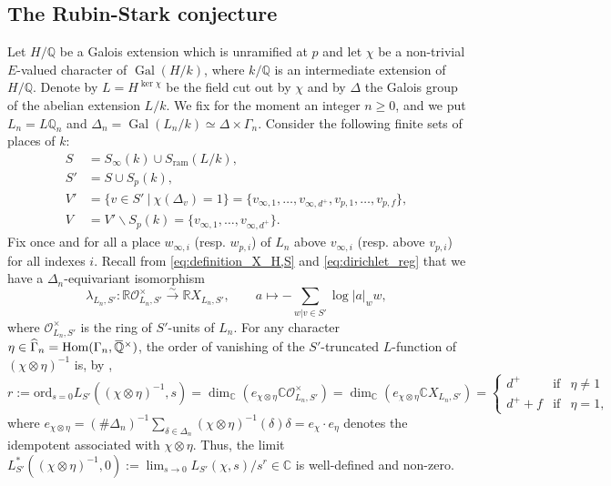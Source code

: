 \documentclass[12pt]{amsart}
\newcommand\bR{\mathbb{R}}
\newcommand\bC{\mathbb{C}}
\newcommand\bQ{\mathbb{Q}}
\newcommand\cO{\mathcal{O}}
\newcommand{\ob}[1]{\mkern 1.5mu\overline{\mkern-1.5mu#1\mkern-1.5mu}\mkern 1.5mu}
\newcommand{\ord}{\mathrm{ord}}
\DeclareMathOperator{\Gal}{Gal}
\DeclareMathOperator{\Hom}{Hom}
\newcommand{\ram}{\textrm{ram}}
\theoremstyle{defstyle}
\theoremstyle{thmstyle}
\begin{document}
\subsection{The Rubin-Stark conjecture}\label{sec:RS_conjecture}
Let $H/\bQ$ be a Galois extension which is unramified at $p$ and let $\chi$ be a non-trivial $E$-valued character of $\Gal(H/k)$, where $k/\bQ$ is an intermediate extension of $H/\bQ$. Denote by $L=H^{\ker\chi}$ be the field cut out by $\chi$ and by $\Delta$ the Galois group of the abelian extension $L/k$. We fix for the moment an integer $n\geq 0$, and we put $L_n=L\bQ_n$ and $\Delta_n=\Gal(L_n/k)\simeq \Delta \times \Gamma_n$. Consider the following finite sets of places of $k$:
\begin{align*}
S&=S_\infty(k)\cup S_\ram(L/k),\\
S'&=S \cup S_p(k),\\
 V'&= \{v \in S'\ \big|\  \chi(\Delta_v)=1\}=\{v_{\infty,1},\ldots,v_{\infty,d^+},v_{p,1},\ldots,v_{p,f}\}, \\
 V&= V' \backslash S_p(k)=\{v_{\infty,1},\ldots,v_{\infty,d^+}\}.
\end{align*}
Fix once and for all a place $w_{\infty,i}$ (resp. $w_{p,i}$) of $L_n$ above $v_{\infty,i}$ (resp. above $v_{p,i}$) for all indexes $i$. Recall from \eqref{eq:definition_X_H,S} and \eqref{eq:dirichlet_reg} that we have a $\Delta_n$-equivariant isomorphism
\begin{equation*}
\lambda_{{L_n},S'} : \bR\cO_{{L_n},S'}^\times \overset{\sim}{\longrightarrow}\bR X_{{L_n},S'}, \qquad a\mapsto - \sum_{w|v\in S'}\log|a|_ww,
\end{equation*}
where $\cO^\times_{{L_n},S'}$ is the ring of $S'$-units of $L_n$. For any character $\eta\in\widehat{\Gamma}_n=\Hom(\Gamma_n,\ob{\bQ}^\times)$, the order of vanishing of the $S'$-truncated $L$-function of $(\chi \otimes \eta)^{-1}$ is, by \cite[Chapter I, Proposition 3.4]{tate},
$$r:=\ord_{s=0} L_{S'}((\chi \otimes \eta)^{-1} ,s) = \dim_{\bC}(e_{\chi\otimes \eta}\bC \cO^\times_{L_n,{S'}})= \dim_{\bC}(e_{\chi\otimes\eta}\bC X_{L_n,S'})= \left\{\begin{array}{lcc}
d^+ & \textrm{if}& \eta\neq 1 \\ d^++f & \textrm{if} &\eta= 1,
\end{array}\right. $$
where $e_{\chi\otimes \eta}= (\#\Delta_n)^{-1} \sum_{\delta\in\Delta_n} (\chi \otimes \eta)^{-1}(\delta)\delta=e_\chi \cdot e_\eta$ denotes the idempotent associated with $\chi \otimes \eta$. Thus, the limit $L^{*}_{S'}({(\chi\otimes\eta)^{-1}},0):=\lim_{s\rightarrow 0} L_{S'}(\chi,s)/s^{r} \in \bC$ is well-defined and non-zero. 
\end{document}
